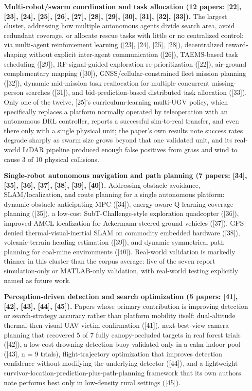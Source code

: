 \documentclass[journal]{IEEEtran}
\begin{document}
\textbf{Multi-robot/swarm coordination and task allocation (12 papers: [22], [23], [24], [25], [26], [27], [28], [29], [30], [31], [32], [33]).} The largest cluster, addressing how multiple autonomous agents divide search area, avoid redundant coverage, or allocate rescue tasks with little or no centralized control: via multi-agent reinforcement learning ([23], [24], [25], [28]), decentralized reward-shaping without explicit inter-agent communication ([26]), TAEMS-based task scheduling ([29]), RF-signal-guided exploration re-prioritization ([22]), air-ground complementary mapping ([30]), GNSS/cellular-constrained fleet mission planning ([32]), dynamic mid-mission task reallocation for multiple concurrent missing-person searches ([31]), and bid-prediction-based distributed task allocation ([33]). Only one of the twelve, [25]'s curriculum-learning multi-UGV policy, which specifically replaces a platform normally operated by teleoperation with an autonomous DRL controller, reports a successful sim-to-real transfer, and even there only with a single physical unit; the paper's own results note success rates degrade sharply as swarm size grows beyond that one validated unit, and its real-world LiDAR pipeline produced enough false positives from grass and wind to cause 3 of 10 physical collisions.

\textbf{Single-robot autonomous navigation and path planning (7 papers: [34], [35], [36], [37], [38], [39], [40]).} Addressing obstacle avoidance, SLAM/localization, and route planning for a single autonomous platform: dynamic-obstacle-anticipating MPC ([34]), energy-aware Q-learning coverage planning ([35]), a low-cost SubT-Challenge-style exploration quadcopter ([36]), improved-AMCL localization for Ackermann-steered ground vehicles ([37]), GPS-denied thermal-visual-inertial SLAM on commodity embedded hardware ([38]), volcanic-terrain heading estimation ([39]), and dynamic symmetrical path planning for coal-mine environments ([40]). Real-world validation is markedly thinner in this cluster than the corpus average: five of the seven report simulation-only or MATLAB-only validation, with real-world testing explicitly named as future work.

\textbf{Perception-driven detection and search optimization (5 papers: [41], [42], [43], [44], [45]).} Papers whose primary contribution is improving detection or search-strategy accuracy rather than platform mobility itself: dual-altitude thermal-then-visual UAV victim confirmation ([41]), next-best-view camera planning that recovered 5 of 7 fully canopy-occluded targets in real forest trials ([42]), a low-cost drowning-detection buoy validated only in a calm indoor pool ([43], n = 9 trials), flight-trajectory optimization that improves detection confidence without modifying the underlying detector ([44]), and a lightweight survivor-location-prediction-plus-path-planning framework that its own authors note performs best only in low-density rural settings ([45]).
\end{document}
